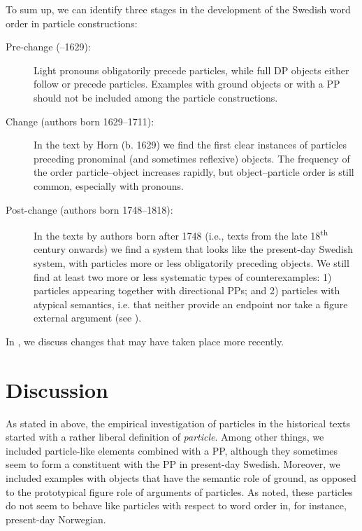 \documentclass[output=paper]{langscibook}
\begin{document}
To sum up, we can identify three stages in the development of the Swedish word order in particle constructions:


\begin{description}
\item[Pre-change (–1629):] Light pronouns obligatorily precede particles, while full DP objects either follow or precede particles. Examples with ground objects or with a PP should not be included among the particle constructions.
\item[Change (authors born 1629–1711):] In the text by Horn (b. 1629) we find the first clear instances of particles preceding pronominal (and sometimes reflexive) objects. The frequency of the order particle--object increases rapidly, but object–particle order is still common, especially with pronouns.
\item[Post-change (authors born 1748–1818):] In the texts by authors born after 1748 (i.e., texts from the late 18\textsuperscript{th} century onwards) we find a system that looks like the present-day Swedish system, with particles more or less obligatorily preceding objects. We still find at least two more or less systematic types of counterexamples: 1) particles appearing together with directional PPs; and 2) particles with atypical semantics, i.e. that neither provide an endpoint nor take a figure external argument (see ).
\end{description}

In , we discuss changes that may have taken place more recently.


\section{Discussion}\label{sec:lalu:6}


As stated in  above, the empirical investigation of particles in the historical texts started with a rather liberal definition of \textit{particle}. Among other things, we included particle-like elements combined with a PP, although they sometimes seem to form a constituent with the PP in present-day Swedish. Moreover, we included examples with objects that have the semantic role of ground, as opposed to the prototypical figure role of arguments of particles. As noted, these particles do not seem to behave like particles with respect to word order in, for instance, present-day Norwegian.
\end{document}

